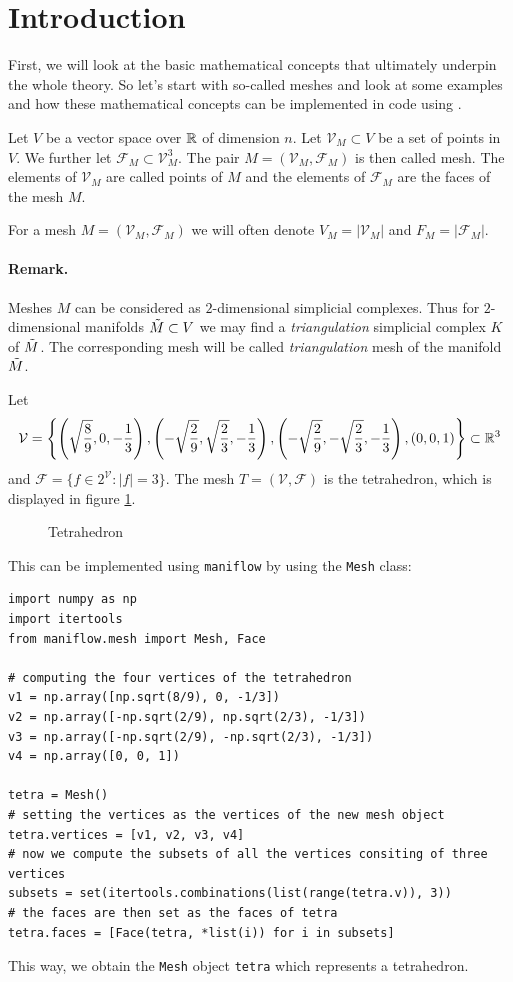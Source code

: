 \section{Introduction}
First, we will look at the basic mathematical concepts that ultimately underpin the whole theory. So let's start with so-called meshes and look at some examples and how these mathematical concepts can be implemented in code using \maniflow{}.
\begin{defi}[Mesh]
    Let $V$ be a vector space  over $\mathbb{R}$ of dimension $n$. Let $\mathcal{V}_M\subset V$ be a set of points in $V$. We further let $\mathcal{F}_M\subset\mathcal{V}_M^3$. The pair $M = (\mathcal{V}_M, \mathcal{F}_M)$ is then called mesh. The elements of $\mathcal{V}_M$ are called points of $M$ and the elements of $\mathcal{F}_M$ are the faces of the mesh $M$.
\end{defi}
For a mesh $M = (\mathcal{V}_M, \mathcal{F}_M)$ we will often denote $V_M = \vert\mathcal{V}_M\vert$ and $F_M = \vert\mathcal{F}_M\vert$.
\paragraph{Remark.} Meshes $M$ can be considered as $2$-dimensional simplicial complexes. Thus for $2$-dimensional manifolds $\Tilde{M}\subset V$ we may find a \textit{triangulation} simplicial complex $K$ of $\Tilde{M}$. The corresponding mesh will be called \textit{triangulation} mesh of the manifold $\Tilde{M}$.
\begin{ex}[Tetrahedron]\label{ex:tetra} Let 
\begin{align*}
    \mathcal{V} = \left\{\left(\sqrt{\frac89},0,-\frac13\right),\left(-\sqrt{\frac29},\sqrt{\frac23},-\frac13\right),\left(-\sqrt{\frac29},-\sqrt{\frac23},-\frac13\right), \left(0,0,1\right)\right\}\subset\mathbb{R}^3
\end{align*}
and $\mathcal{F} = \{f\in2^{\mathcal{V}}:\vert f\vert = 3\}$. The mesh $T = (\mathcal{V},\mathcal{F})$ is the tetrahedron, which is displayed in figure \ref{fig:tetra}.
    \begin{figure}[h]
        \centering
        
        \caption{Tetrahedron}
        \label{fig:tetra}
    \end{figure}
This can be implemented using \texttt{maniflow} by using the \texttt{Mesh} class:
\begin{lstlisting}
import numpy as np
import itertools
from maniflow.mesh import Mesh, Face

# computing the four vertices of the tetrahedron
v1 = np.array([np.sqrt(8/9), 0, -1/3])
v2 = np.array([-np.sqrt(2/9), np.sqrt(2/3), -1/3])
v3 = np.array([-np.sqrt(2/9), -np.sqrt(2/3), -1/3])
v4 = np.array([0, 0, 1])

tetra = Mesh()
# setting the vertices as the vertices of the new mesh object
tetra.vertices = [v1, v2, v3, v4]
# now we compute the subsets of all the vertices consiting of three vertices
subsets = set(itertools.combinations(list(range(tetra.v)), 3))
# the faces are then set as the faces of tetra
tetra.faces = [Face(tetra, *list(i)) for i in subsets]
\end{lstlisting}
This way, we obtain the \texttt{Mesh} object \texttt{tetra} which represents a tetrahedron.
\end{ex}
